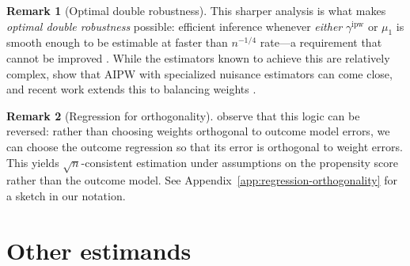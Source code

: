 \documentclass{article}
\theoremstyle{definition}
\newtheorem{remark}{Remark}
\newcommand{\ipw}{\text{ipw}}
\newcommand{\gammaipw}{\ensuremath{\gamma^{\ipw}}}
\newcommand{\<}{\langle}
\renewcommand{\>}{\rangle}
\begin{document}
\begin{remark}[Optimal double robustness]
\label{remark:optimal-dr}
This sharper analysis is what makes \emph{optimal double robustness} possible: efficient inference whenever \emph{either} $\gammaipw$ or $\mu_1$ is smooth enough to be estimable at faster than $n^{-1/4}$ rate---a requirement that cannot be improved \citep{mukherjee2017semiparametric, robins2009semiparametric}. While the estimators known to achieve this are relatively complex, \citet{newey2018cross} show that AIPW with specialized nuisance estimators can come close, and recent work extends this to balancing weights \citep{hirshberg2019minimax, kennedy2020optimal}.
\end{remark}

\begin{remark}[Regression for orthogonality]
\label{remark:regression-for-orthogonality}
\citet{wang2020debiased} observe that this logic can be reversed: rather than choosing weights orthogonal to outcome model errors, we can choose the outcome regression so that its error is orthogonal to weight errors. This yields $\sqrt{n}$-consistent estimation under assumptions on the propensity score rather than the outcome model. See Appendix~\ref{app:regression-orthogonality} for a sketch in our notation.
\end{remark}


\section{Other estimands}
\label{sec:other-estimands}
\end{document}
